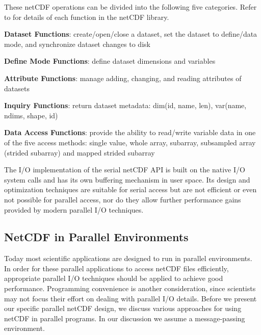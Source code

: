 \documentclass[10pt,twocolumn]{article}          %
\begin{document}
These netCDF operations can be divided into the following five categories. Refer to
\cite{RDED97} for details of each function in the netCDF library.


\begin{list}{()}{\setlength{\rightmargin}{\leftmargin}}
\item \textbf{Dataset Functions}: create/open/close a dataset, set the dataset to define/data mode, and synchronize dataset
changes to disk
\item \textbf{Define Mode Functions}: define dataset dimensions and variables
\item \textbf{Attribute Functions}: manage adding, changing, and reading attributes of datasets
\item \textbf{Inquiry Functions}: return dataset metadata: dim(id, name, len), var(name, ndims, shape, id)
\item \textbf{Data Access Functions}: provide the ability to read/write variable data in one of the five access methods: single value, whole array,
subarray, subsampled array (strided subarray) and mapped strided subarray
\end{list}

The I/O implementation of the serial netCDF API is built on the native I/O system calls and has its
own buffering mechanism in user space. Its design and optimization techniques are suitable for
serial access but are not efficient or even not possible for parallel access, nor do they allow
further performance gains provided by modern parallel I/O techniques.

\subsection{NetCDF in Parallel Environments}

Today most scientific applications are designed to run in parallel environments. In order for these
parallel applications to access netCDF files efficiently, appropriate parallel I/O techniques
should be applied to achieve good performance. Programming convenience is another
consideration, since scientists may not focus their effort on dealing with parallel I/O details.
Before we present our specific parallel netCDF design, we discuss various approaches for using netCDF in parallel
programs. In our discussion we assume a message-passing environment.
\end{document}
